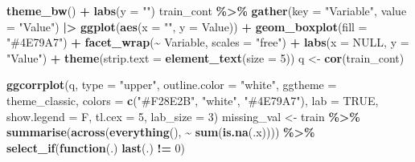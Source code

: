 \documentclass[
]{article}
\newenvironment{Shaded}{\begin{snugshade}}{\end{snugshade}}
\newcommand{\AttributeTok}[1]{\textcolor[rgb]{0.13,0.29,0.53}{#1}}
\newcommand{\ConstantTok}[1]{\textcolor[rgb]{0.56,0.35,0.01}{#1}}
\newcommand{\ControlFlowTok}[1]{\textcolor[rgb]{0.13,0.29,0.53}{\textbf{#1}}}
\newcommand{\DecValTok}[1]{\textcolor[rgb]{0.00,0.00,0.81}{#1}}
\newcommand{\FunctionTok}[1]{\textcolor[rgb]{0.13,0.29,0.53}{\textbf{#1}}}
\newcommand{\NormalTok}[1]{#1}
\newcommand{\OtherTok}[1]{\textcolor[rgb]{0.56,0.35,0.01}{#1}}
\newcommand{\SpecialCharTok}[1]{\textcolor[rgb]{0.81,0.36,0.00}{\textbf{#1}}}
\newcommand{\StringTok}[1]{\textcolor[rgb]{0.31,0.60,0.02}{#1}}
\begin{document}
\begin{Shaded}
\begin{Highlighting}[]
  \FunctionTok{theme\_bw}\NormalTok{() }\SpecialCharTok{+}
  \FunctionTok{labs}\NormalTok{(}\AttributeTok{y =} \StringTok{""}\NormalTok{) }
\NormalTok{train\_cont }\SpecialCharTok{\%\textgreater{}\%}
  \FunctionTok{gather}\NormalTok{(}\AttributeTok{key =} \StringTok{"Variable"}\NormalTok{, }\AttributeTok{value =} \StringTok{"Value"}\NormalTok{) }\SpecialCharTok{|\textgreater{}}
  \FunctionTok{ggplot}\NormalTok{(}\FunctionTok{aes}\NormalTok{(}\AttributeTok{x =} \StringTok{""}\NormalTok{, }\AttributeTok{y =}\NormalTok{ Value)) }\SpecialCharTok{+}  
  \FunctionTok{geom\_boxplot}\NormalTok{(}\AttributeTok{fill =} \StringTok{"\#4E79A7"}\NormalTok{) }\SpecialCharTok{+}
  \FunctionTok{facet\_wrap}\NormalTok{(}\SpecialCharTok{\textasciitilde{}}\NormalTok{ Variable, }\AttributeTok{scales =} \StringTok{"free"}\NormalTok{) }\SpecialCharTok{+} 
  \FunctionTok{labs}\NormalTok{(}\AttributeTok{x =} \ConstantTok{NULL}\NormalTok{, }\AttributeTok{y =} \StringTok{"Value"}\NormalTok{) }\SpecialCharTok{+}  
  \FunctionTok{theme}\NormalTok{(}\AttributeTok{strip.text =} \FunctionTok{element\_text}\NormalTok{(}\AttributeTok{size =} \DecValTok{5}\NormalTok{))}
\NormalTok{q }\OtherTok{\textless{}{-}} \FunctionTok{cor}\NormalTok{(train\_cont)}

\FunctionTok{ggcorrplot}\NormalTok{(q, }\AttributeTok{type =} \StringTok{"upper"}\NormalTok{, }\AttributeTok{outline.color =} \StringTok{"white"}\NormalTok{,}
           \AttributeTok{ggtheme =}\NormalTok{ theme\_classic,}
           \AttributeTok{colors =} \FunctionTok{c}\NormalTok{(}\StringTok{"\#F28E2B"}\NormalTok{, }\StringTok{"white"}\NormalTok{, }\StringTok{"\#4E79A7"}\NormalTok{),}
           \AttributeTok{lab =} \ConstantTok{TRUE}\NormalTok{, }\AttributeTok{show.legend =}\NormalTok{ F, }\AttributeTok{tl.cex =} \DecValTok{5}\NormalTok{, }\AttributeTok{lab\_size =} \DecValTok{3}\NormalTok{) }
\NormalTok{missing\_val }\OtherTok{\textless{}{-}}
\NormalTok{  train }\SpecialCharTok{\%\textgreater{}\%}
  \FunctionTok{summarise}\NormalTok{(}\FunctionTok{across}\NormalTok{(}\FunctionTok{everything}\NormalTok{(), }\SpecialCharTok{\textasciitilde{}} \FunctionTok{sum}\NormalTok{(}\FunctionTok{is.na}\NormalTok{(.x)))) }\SpecialCharTok{\%\textgreater{}\%}
  \FunctionTok{select\_if}\NormalTok{(}\ControlFlowTok{function}\NormalTok{(.) }\FunctionTok{last}\NormalTok{(.) }\SpecialCharTok{!=} \DecValTok{0}\NormalTok{)}


\end{Highlighting}
\end{Shaded}
\end{document}
